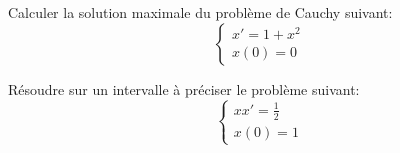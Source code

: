 \begin{td-exo}[] %
	Calculer la solution maximale du problème de Cauchy suivant:
	\begin{equation*}
		\begin{cases}
			x'=1+x^2\\
			x(0)=0
		\end{cases}
	\end{equation*}

\end{td-exo}

\begin{td-exo}[] %
	Résoudre sur un intervalle à préciser le problème suivant:
	\begin{equation*}
		\begin{cases}
			xx'=\frac12\\
			x(0)=1
		\end{cases}
	\end{equation*}

\end{td-exo}


